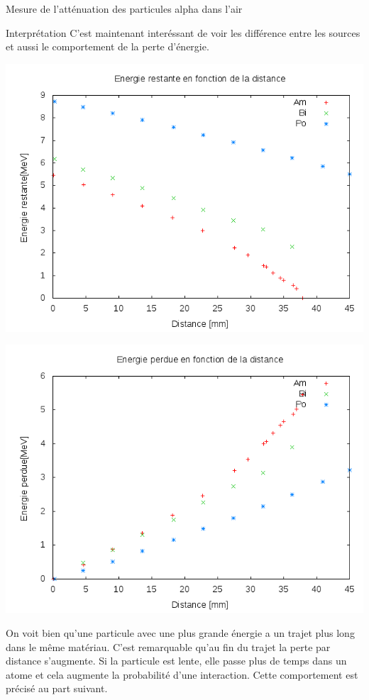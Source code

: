 \documentclass[a4paper,11pt,liststotocnumbered,bibtotocnumbered]{scrartcl}
\begin{document}
\begin{section}{Mesure de l'atténuation des particules alpha dans l'air}
  \begin{subsection}{Interprétation}
   C'est maintenant interéssant de voir les différence entre les sources et aussi le comportement de la perte d'énergie.\\
   \begin{minipage}{0.45\textwidth}
    \includegraphics[width=\textwidth]{Sabine/alle.png}
   \end{minipage}
   \hfill
   \begin{minipage}{0.45\textwidth}
    \includegraphics[width=\textwidth]{Sabine/alle_perte.png}
   \end{minipage}
   On voit bien qu'une particule avec une plus grande énergie a un trajet plus long dans le même matériau. C'est remarquable qu'au fin du trajet la perte par distance s'augmente. Si la particule est lente, elle passe plus de temps dans un atome et cela augmente la probabilité d'une interaction. Cette comportement est précisé au part suivant. 
  \end{subsection}
 \end{section}
\end{document}
